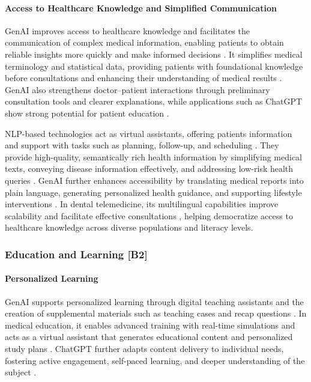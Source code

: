\paragraph{Access to Healthcare Knowledge and Simplified Communication}
GenAI improves access to healthcare knowledge and facilitates the communication of complex medical information, enabling patients to obtain reliable insights more quickly and make informed decisions \parencite{R09}. It simplifies medical terminology and statistical data, providing patients with foundational knowledge before consultations and enhancing their understanding of medical results \parencite{S01}. GenAI also strengthens doctor–patient interactions through preliminary consultation tools and clearer explanations, while applications such as ChatGPT show strong potential for patient education \parencite{S01,S02,S03}.

NLP-based technologies act as virtual assistants, offering patients information and support with tasks such as planning, follow-up, and scheduling \parencite{S10}. They provide high-quality, semantically rich health information by simplifying medical texts, conveying disease information effectively, and addressing low-risk health queries \parencite{S11}. GenAI further enhances accessibility by translating medical reports into plain language, generating personalized health guidance, and supporting lifestyle interventions \parencite{S14,S17}. In dental telemedicine, its multilingual capabilities improve scalability and facilitate effective consultations \parencite{S17}, helping democratize access to healthcare knowledge across diverse populations and literacy levels.

\subsubsection{Education and Learning [B2]}
\paragraph{Personalized Learning}
GenAI supports personalized learning through digital teaching assistants and the creation of supplemental materials such as teaching cases and recap questions \parencite{R04}. In medical education, it enables advanced training with real-time simulations \parencite{S01} and acts as a virtual assistant that generates educational content and personalized study plans \parencite{S10}. ChatGPT further adapts content delivery to individual needs, fostering active engagement, self-paced learning, and deeper understanding of the subject \parencite{S12}.

